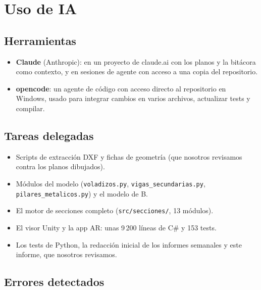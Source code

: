 \documentclass[11pt,a4paper]{article}
\begin{document}
\section{Uso de IA}

\subsection{Herramientas}

\begin{itemize}
  \item \textbf{Claude} (Anthropic): en un proyecto de claude.ai con los planos
        y la bitácora como contexto, y en sesiones de agente con acceso a una
        copia del repositorio.
  \item \textbf{opencode}: un agente de código con acceso directo al
        repositorio en Windows, usado para integrar cambios en varios archivos,
        actualizar tests y compilar.
\end{itemize}

\subsection{Tareas delegadas}

\begin{itemize}
  \item Scripts de extracción DXF y fichas de geometría (que nosotros revisamos
        contra los planos dibujados).
  \item Módulos del modelo (\texttt{voladizos.py},
        \texttt{vigas\_secundarias.py}, \texttt{pilares\_metalicos.py}) y el
        modelo de B.
  \item El motor de secciones completo (\texttt{src/secciones/}, 13 módulos).
  \item El visor Unity y la app AR: unas 9\,200 líneas de C\# y 153 tests.
  \item Los tests de Python, la redacción inicial de los informes semanales y
        este informe, que nosotros revisamos.
\end{itemize}

\subsection{Errores detectados}
\end{document}
